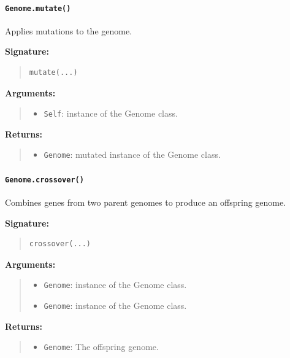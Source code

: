 \documentclass[11pt]{article}
\begin{document}
\paragraph{\texttt{Genome.mutate()}}

Applies mutations to the genome.

\textbf{Signature:}
\begin{quote}
\begin{verbatim}
mutate(...)
\end{verbatim}
\end{quote}

\textbf{Arguments:}
\begin{quote}
\begin{itemize}
    \item \texttt{Self}: instance of the Genome class.
\end{itemize}
\end{quote}

\textbf{Returns:}
\begin{quote}
\begin{itemize}
    \item \texttt{Genome}: mutated instance of the Genome class.
\end{itemize}
\end{quote}

\paragraph{\texttt{Genome.crossover()}}

Combines genes from two parent genomes to produce an offspring genome.

\textbf{Signature:}
\begin{quote}
\begin{verbatim}
crossover(...)
\end{verbatim}
\end{quote}

\textbf{Arguments:}
\begin{quote}
\begin{itemize}
    \item \texttt{Genome}: instance of the Genome class.
    \item \texttt{Genome}: instance of the Genome class.
\end{itemize}
\end{quote}

\textbf{Returns:}
\begin{quote}
\begin{itemize}
    \item \texttt{Genome}: The offspring genome.
\end{itemize}
\end{quote}
\end{document}
